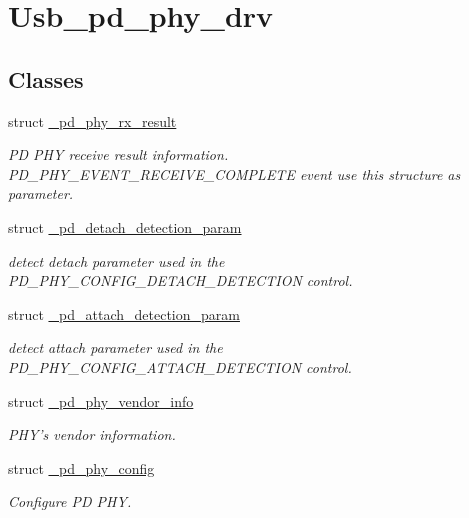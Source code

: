 \hypertarget{group__usb__pd__phy__drv}{\section{Usb\-\_\-pd\-\_\-phy\-\_\-drv}
\label{group__usb__pd__phy__drv}
}
\subsection*{Classes}
\begin{DoxyCompactItemize}
\item 
struct \hyperlink{struct__pd__phy__rx__result}{\-\_\-pd\-\_\-phy\-\_\-rx\-\_\-result}
\begin{DoxyCompactList}\small\item\em P\-D P\-H\-Y receive result information. P\-D\-\_\-\-P\-H\-Y\-\_\-\-E\-V\-E\-N\-T\-\_\-\-R\-E\-C\-E\-I\-V\-E\-\_\-\-C\-O\-M\-P\-L\-E\-T\-E event use this structure as parameter. \end{DoxyCompactList}\item 
struct \hyperlink{struct__pd__detach__detection__param}{\-\_\-pd\-\_\-detach\-\_\-detection\-\_\-param}
\begin{DoxyCompactList}\small\item\em detect detach parameter used in the P\-D\-\_\-\-P\-H\-Y\-\_\-\-C\-O\-N\-F\-I\-G\-\_\-\-D\-E\-T\-A\-C\-H\-\_\-\-D\-E\-T\-E\-C\-T\-I\-O\-N control. \end{DoxyCompactList}\item 
struct \hyperlink{struct__pd__attach__detection__param}{\-\_\-pd\-\_\-attach\-\_\-detection\-\_\-param}
\begin{DoxyCompactList}\small\item\em detect attach parameter used in the P\-D\-\_\-\-P\-H\-Y\-\_\-\-C\-O\-N\-F\-I\-G\-\_\-\-A\-T\-T\-A\-C\-H\-\_\-\-D\-E\-T\-E\-C\-T\-I\-O\-N control. \end{DoxyCompactList}\item 
struct \hyperlink{struct__pd__phy__vendor__info}{\-\_\-pd\-\_\-phy\-\_\-vendor\-\_\-info}
\begin{DoxyCompactList}\small\item\em P\-H\-Y's vendor information. \end{DoxyCompactList}\item 
struct \hyperlink{struct__pd__phy__config}{\-\_\-pd\-\_\-phy\-\_\-config}
\begin{DoxyCompactList}\small\item\em Configure P\-D P\-H\-Y. \end{DoxyCompactList}\item 

\end{DoxyCompactItemize}
